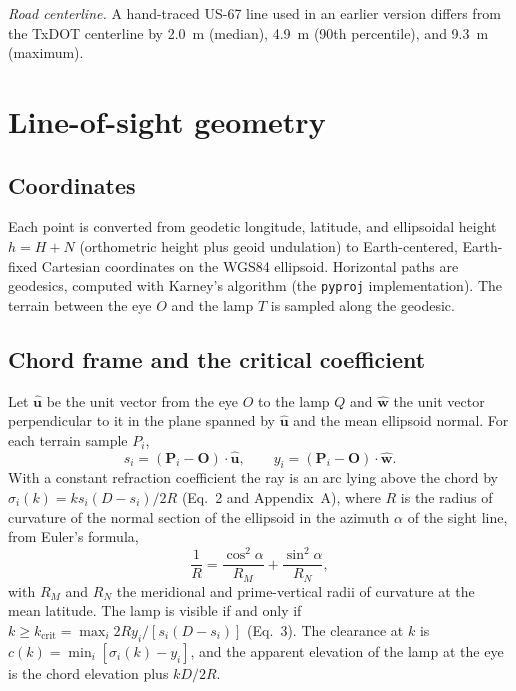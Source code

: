 \documentclass[11pt]{article}
\newcommand{\kc}{k_{\mathrm{crit}}}
\begin{document}
\textit{Road centerline.} A hand-traced US-67 line used in an earlier version differs from the TxDOT centerline by 2.0~m (median), 4.9~m (90th percentile), and 9.3~m (maximum).

\section{Line-of-sight geometry}\label{s:geometry}

\subsection{Coordinates}

Each point is converted from geodetic longitude, latitude, and ellipsoidal height $h=H+N$ (orthometric height plus geoid undulation) to Earth-centered, Earth-fixed Cartesian coordinates on the WGS84 ellipsoid. Horizontal paths are geodesics, computed with Karney's algorithm\cite{Karney2013} (the \texttt{pyproj} implementation). The terrain between the eye $O$ and the lamp $T$ is sampled along the geodesic.

\subsection{Chord frame and the critical coefficient}

Let $\hat{\mathbf u}$ be the unit vector from the eye $O$ to the lamp $Q$ and $\hat{\mathbf w}$ the unit vector perpendicular to it in the plane spanned by $\hat{\mathbf u}$ and the mean ellipsoid normal. For each terrain sample $P_i$,
\begin{equation}
s_i=(\mathbf P_i-\mathbf O)\cdot\hat{\mathbf u},\qquad y_i=(\mathbf P_i-\mathbf O)\cdot\hat{\mathbf w}.
\end{equation}
With a constant refraction coefficient the ray is an arc lying above the chord by $\sigma_i(k)=ks_i(D-s_i)/2R$ (Eq.~2 and Appendix~A), where $R$ is the radius of curvature of the normal section of the ellipsoid in the azimuth $\alpha$ of the sight line, from Euler's formula,
\begin{equation}
\frac1R=\frac{\cos^2\alpha}{R_M}+\frac{\sin^2\alpha}{R_N},
\end{equation}
with $R_M$ and $R_N$ the meridional and prime-vertical radii of curvature at the mean latitude. The lamp is visible if and only if $k\ge\kc=\max_i 2Ry_i/[s_i(D-s_i)]$ (Eq.~3). The clearance at $k$ is $c(k)=\min_i[\sigma_i(k)-y_i]$, and the apparent elevation of the lamp at the eye is the chord elevation plus $kD/2R$.
\end{document}
